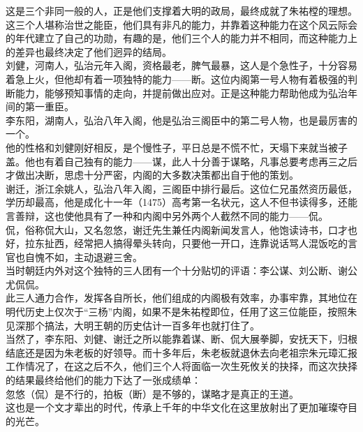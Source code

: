 \begin{multicols}{\theparacolNo}
这是三个非同一般的人，正是他们支撑着大明的政局，最终成就了朱祐樘的理想。这三个人堪称治世之能臣，他们具有非凡的能力，并靠着这种能力在这个风云际会的年代建立了自己的功勋，有趣的是，他们三个人的能力并不相同，而这种能力上的差异也最终决定了他们迥异的结局。\\

刘健，河南人，弘治元年入阁，资格最老，脾气最暴，这人是个急性子，十分容易着急上火，但他却有着一项独特的能力——断。这位内阁第一号人物有着极强的判断能力，能够预知事情的走向，并提前做出应对。正是这种能力帮助他成为弘治年间的第一重臣。\\

李东阳，湖南人，弘治八年入阁，他是弘治三阁臣中的第二号人物，也是最厉害的一个。\\

他的性格和刘健刚好相反，是个慢性子，平日总是不慌不忙，天塌下来就当被子盖。他也有着自己独有的能力——谋，此人十分善于谋略，凡事总要考虑再三之后才做出决断，思虑十分严密，内阁的大多数决策都出自于他的策划。\\

谢迁，浙江余姚人，弘治八年入阁，三阁臣中排行最后。这位仁兄虽然资历最低，学历却最高，他是成化十一年（1475）高考第一名状元，这人不但书读得多，还能言善辩，这也使他具有了一种和内阁中另外两个人截然不同的能力——侃。\\

侃，俗称侃大山，又名忽悠，谢迁先生兼任内阁新闻发言人，他饱读诗书，口才也好，拉东扯西，经常把人搞得晕头转向，只要他一开口，连靠说话骂人混饭吃的言官也自愧不如，主动退避三舍。\\

当时朝廷内外对这个独特的三人团有一个十分贴切的评语：李公谋、刘公断、谢公尤侃侃。\\

此三人通力合作，发挥各自所长，他们组成的内阁极有效率，办事牢靠，其地位在明代历史上仅次于“三杨”内阁，如果不是朱祐樘即位，任用了这三位能臣，按照朱见深那个搞法，大明王朝的历史估计一百多年也就打住了。\\

当然了，李东阳、刘健、谢迁之所以能靠着谋、断、侃大展拳脚，安抚天下，归根结底还是因为朱老板的好领导。而十多年后，朱老板就退休去向老祖宗朱元璋汇报工作情况了，在这之后不久，他们三个人将面临一次生死攸关的抉择，而这次抉择的结果最终给他们的能力下达了一张成绩单：\\

忽悠（侃）是不行的，拍板（断）是不够的，谋略才是真正的王道。\\

这也是一个文才辈出的时代，传承上千年的中华文化在这里放射出了更加璀璨夺目的光芒。\\


\end{multicols}
